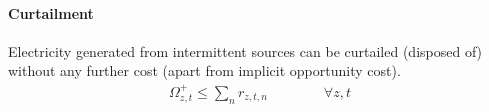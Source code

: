\documentclass[11pt,a4paper]{article}
\begin{document}
\paragraph{Curtailment}
Electricity generated from intermittent sources can be curtailed (disposed of) without any further cost (apart from implicit opportunity cost). 
\begin{align}
\Omega^{+}_{z,t} \leq \sum_{n} r_{z,t,n} \qquad \qquad \forall z, t
\end{align}
\end{document}
